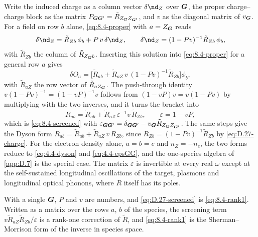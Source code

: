 Write the induced charge as a column vector $\delta\nd_Z$ over $\bm{G}$, the proper charge--charge block as the matrix $P_{\bm{G}\bm{G}'} = \tilde R_{Z_{\bm{G}}Z_{\bm{G}'}}$, and $v$ as the diagonal matrix of $v_{\bm{G}}$. For a field on row $b$ alone, \cref{eq:8.4-proper} with $a = Z_{\bm{G}}$ reads
\begin{equation}
  \delta\nd_Z = \tilde R_{Zb}\,\phi_b + P\,v\,\delta\nd_Z , \qquad
  \delta\nd_Z = (1 - Pv)^{-1}\tilde R_{Zb}\,\phi_b ,
  \label{eq:D.27-charge}
\end{equation}
with $\tilde R_{Zb}$ the column of $\tilde R_{Z_{\bm{G}}b}$. Inserting this solution into \cref{eq:8.4-proper} for a general row $a$ gives
\begin{equation*}
  \delta O_a = \bigl[\tilde R_{ab} + \tilde R_{aZ}\,v\,(1 - Pv)^{-1}\tilde R_{Zb}\bigr]\phi_b ,
\end{equation*}
with $\tilde R_{aZ}$ the row vector of $\tilde R_{aZ_{\bm{G}}}$. The push-through identity $v(1 - Pv)^{-1} = (1 - vP)^{-1}v$ follows from $(1 - vP)v = v(1 - Pv)$ by multiplying with the two inverses, and it turns the bracket into
\begin{equation}
  R_{ab} = \tilde R_{ab} + \tilde R_{aZ}\,\varepsilon^{-1}v\,\tilde R_{Zb} , \qquad
  \varepsilon = 1 - vP ,
  \label{eq:D.27-screened}
\end{equation}
which is \cref{eq:8.4-screened} with $\varepsilon_{\bm{G}\bm{G}'} = \delta_{\bm{G}\bm{G}'} - v_{\bm{G}}\tilde R_{Z_{\bm{G}}Z_{\bm{G}'}}$. The same steps give the Dyson form $R_{ab} = \tilde R_{ab} + \tilde R_{aZ}\,v\,R_{Zb}$, since $R_{Zb} = (1 - Pv)^{-1}\tilde R_{Zb}$ by \cref{eq:D.27-charge}. For the electron density alone, $a = b = e$ and $n_Z = -n_e$, the two forms reduce to \cref{eq:4.4-dyson} and \cref{eq:4.4-epsGG}, and the one-species algebra of \cref{app:D.7} is the special case. The matrix $\varepsilon$ is invertible at every real $\omega$ except at the self-sustained longitudinal oscillations of the target, plasmons and longitudinal optical phonons, where $R$ itself has its poles.

With a single $\bm{G}$, $P$ and $v$ are numbers, and \cref{eq:D.27-screened} is \cref{eq:8.4-rank1}. Written as a matrix over the rows $a$, $b$ of the species, the screening term $v\tilde R_{aZ}\tilde R_{Zb}/\varepsilon$ is a rank-one correction of $\tilde R$, and \cref{eq:8.4-rank1} is the Sherman--Morrison form of the inverse in species space.

